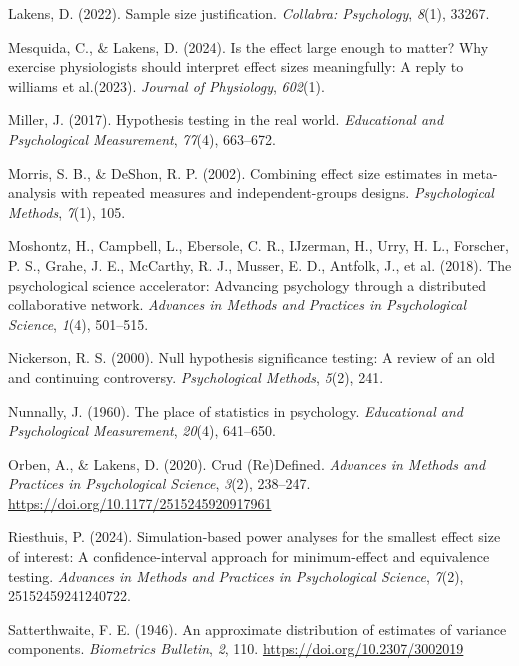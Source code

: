 \documentclass[
  man,floatsintext]{apa7}
\newlength{\cslhangindent}
\newenvironment{CSLReferences}[2] %
 {\begin{list}{}{%
  \setlength{\itemindent}{0pt}
  \setlength{\leftmargin}{0pt}
  \setlength{\parsep}{0pt}
  \ifodd #1
   \setlength{\leftmargin}{\cslhangindent}
   \setlength{\itemindent}{-1\cslhangindent}
  \fi
  \setlength{\itemsep}{#2\baselineskip}}}
 {\end{list}}
\begin{document}
\begin{CSLReferences}{1}{0}
Lakens, D. (2022). Sample size justification. \emph{Collabra: Psychology}, \emph{8}(1), 33267.

Mesquida, C., \& Lakens, D. (2024). Is the effect large enough to matter? Why exercise physiologists should interpret effect sizes meaningfully: A reply to williams et al.(2023). \emph{Journal of Physiology}, \emph{602}(1).

Miller, J. (2017). Hypothesis testing in the real world. \emph{Educational and Psychological Measurement}, \emph{77}(4), 663--672.

Morris, S. B., \& DeShon, R. P. (2002). Combining effect size estimates in meta-analysis with repeated measures and independent-groups designs. \emph{Psychological Methods}, \emph{7}(1), 105.

Moshontz, H., Campbell, L., Ebersole, C. R., IJzerman, H., Urry, H. L., Forscher, P. S., Grahe, J. E., McCarthy, R. J., Musser, E. D., Antfolk, J., et al. (2018). The psychological science accelerator: Advancing psychology through a distributed collaborative network. \emph{Advances in Methods and Practices in Psychological Science}, \emph{1}(4), 501--515.

Nickerson, R. S. (2000). Null hypothesis significance testing: A review of an old and continuing controversy. \emph{Psychological Methods}, \emph{5}(2), 241.

Nunnally, J. (1960). The place of statistics in psychology. \emph{Educational and Psychological Measurement}, \emph{20}(4), 641--650.

Orben, A., \& Lakens, D. (2020). Crud ({Re}){Defined}. \emph{Advances in Methods and Practices in Psychological Science}, \emph{3}(2), 238--247. \url{https://doi.org/10.1177/2515245920917961}

Riesthuis, P. (2024). Simulation-based power analyses for the smallest effect size of interest: A confidence-interval approach for minimum-effect and equivalence testing. \emph{Advances in Methods and Practices in Psychological Science}, \emph{7}(2), 25152459241240722.

Satterthwaite, F. E. (1946). An approximate distribution of estimates of variance components. \emph{Biometrics Bulletin}, \emph{2}, 110. \url{https://doi.org/10.2307/3002019}


\end{CSLReferences}
\end{document}
